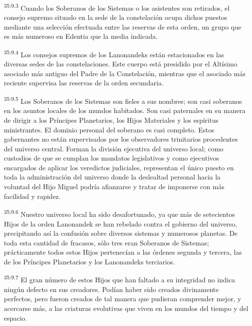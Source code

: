 \par
\textsuperscript{35:9.3} Cuando los Soberanos de los Sistemas o los asistentes son retirados, el consejo supremo situado en la sede de la constelación ocupa dichos puestos mediante una selección efectuada entre las reservas de esta orden, un grupo que es más numeroso en Edentia que la media indicada.

\par
\textsuperscript{35:9.4} Los consejos supremos de los Lanonandeks están estacionados en las diversas sedes de las constelaciones. Este cuerpo está presidido por el Altísimo asociado más antiguo del Padre de la Constelación, mientras que el asociado más reciente supervisa las reservas de la orden secundaria.

\par
\textsuperscript{35:9.5} Los Soberanos de los Sistemas son fieles a sus nombres; son casi soberanos en los asuntos locales de los mundos habitados. Son casi paternales en su manera de dirigir a los Príncipes Planetarios, los Hijos Materiales y los espíritus ministrantes. El dominio personal del soberano es casi completo. Estos gobernantes no están supervisados por los observadores trinitarios procedentes del universo central. Forman la división ejecutiva del universo local; como custodios de que se cumplan los mandatos legislativos y como ejecutivos encargados de aplicar los veredictos judiciales, representan el único puesto en toda la administración del universo donde la deslealtad personal hacia la voluntad del Hijo Miguel podría afianzarse y tratar de imponerse con más facilidad y rapidez.

\par
\textsuperscript{35:9.6} Nuestro universo local ha sido desafortunado, ya que más de setecientos Hijos de la orden Lanonandek se han rebelado contra el gobierno del universo, precipitando así la confusión sobre diversos sistemas y numerosos planetas. De toda esta cantidad de fracasos, sólo tres eran Soberanos de Sistemas; prácticamente todos estos Hijos pertenecían a las órdenes segunda y tercera, las de los Príncipes Planetarios y los Lanonandeks terciarios.

\par
\textsuperscript{35:9.7} El gran número de estos Hijos que han faltado a su integridad no indica ningún defecto en sus creadores. Podían haber sido creados divinamente perfectos, pero fueron creados de tal manera que pudieran comprender mejor, y acercarse más, a las criaturas evolutivas que viven en los mundos del tiempo y del espacio.

